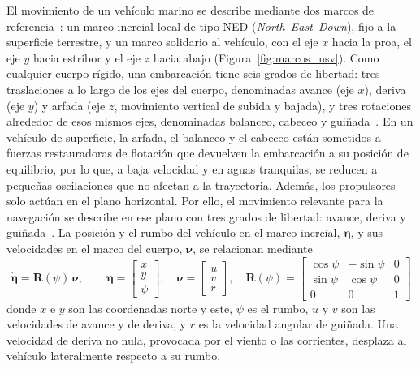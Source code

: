 El movimiento de un vehículo marino se describe mediante dos marcos de
referencia~\cite{jin2025}: un marco inercial local de tipo NED
(\textit{North--East--Down}), fijo a la superficie terrestre, y un marco solidario al
vehículo, con el eje $x$ hacia la proa, el eje $y$ hacia estribor y el eje $z$ hacia
abajo (Figura~\ref{fig:marcos_usv}). Como cualquier cuerpo rígido, una embarcación
tiene seis grados de libertad: tres traslaciones a lo largo de los ejes del cuerpo,
denominadas avance (eje $x$), deriva (eje $y$) y arfada (eje $z$, movimiento vertical
de subida y bajada), y tres rotaciones alrededor de esos mismos ejes, denominadas
balanceo, cabeceo y guiñada~\cite{jin2025}. En un vehículo de superficie, la arfada,
el balanceo y el cabeceo están sometidos a fuerzas restauradoras de flotación que
devuelven la embarcación a su posición de equilibrio, por lo que, a baja velocidad y en
aguas tranquilas, se reducen a pequeñas oscilaciones que no afectan a la trayectoria.
Además, los propulsores solo actúan en el plano horizontal. Por ello, el movimiento
relevante para la navegación se describe en ese plano con tres grados de libertad:
avance, deriva y guiñada~\cite{jin2025}. La posición y el rumbo del vehículo en el marco
inercial, $\boldsymbol{\eta}$, y sus velocidades en el marco del cuerpo,
$\boldsymbol{\nu}$, se relacionan mediante
\begin{equation}
  \dot{\boldsymbol{\eta}} = \mathbf{R}(\psi)\,\boldsymbol{\nu},
  \qquad
  \boldsymbol{\eta} = \begin{bmatrix} x \\ y \\ \psi \end{bmatrix},
  \quad
  \boldsymbol{\nu} = \begin{bmatrix} u \\ v \\ r \end{bmatrix},
  \quad
  \mathbf{R}(\psi) =
  \begin{bmatrix}
    \cos\psi & -\sin\psi & 0 \\
    \sin\psi &  \cos\psi & 0 \\
    0 & 0 & 1
  \end{bmatrix}
  \label{eq:cinematica}
\end{equation}
donde $x$ e $y$ son las coordenadas norte y este, $\psi$ es el rumbo, $u$ y $v$ son las
velocidades de avance y de deriva, y $r$ es la velocidad angular de guiñada. Una
velocidad de deriva no nula, provocada por el viento o las corrientes, desplaza al
vehículo lateralmente respecto a su rumbo.
 
